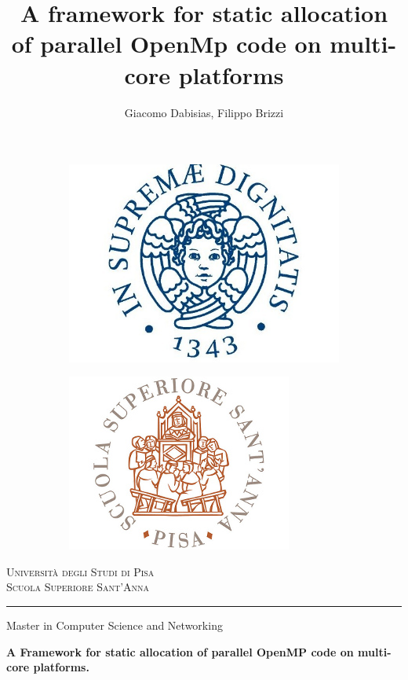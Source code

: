 \documentclass[a4paper,12pt,oneside]{book}
\author{Giacomo Dabisias, Filippo Brizzi}
\title{A framework for static allocation of parallel OpenMp code on multi-core platforms}
\begin{document}
\begin{titlepage}

\begin{center}
\begin{figure}
\centering
\begin{subfigure}{0.4\textwidth}
  \centering
  \includegraphics[]{unipi.jpeg}
\end{subfigure}%
\begin{subfigure}{0.4\textwidth}
  \centering
  \includegraphics[scale=0.93]{anna.jpg}
\end{subfigure}
\end{figure}
\vspace*{0.1cm}
\Huge{\textsc{Universit\`a degli Studi di Pisa}} \\
\vspace*{0.3cm}
\Huge{\textsc{Scuola Superiore Sant'Anna}}
\rule{\linewidth}{0.1mm}
\Large{{Master in Computer Science and Networking}}
\vspace*{2cm}

\Huge{\textbf{A Framework for static allocation of parallel OpenMP code on multi-core platforms.}}


\end{center}
\end{titlepage}
\end{document}
